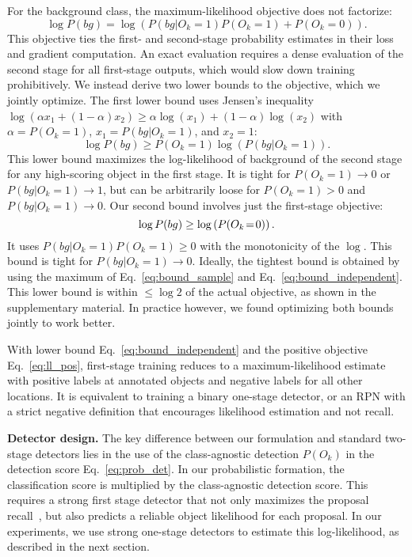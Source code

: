 \documentclass{article}
\renewcommand{\paragraph}[1]{\noindent\textbf{#1}}
\newcommand{\shortrefeq}[1]{Eq.~\eqref{eq:#1}}
\newcommand{\lbleq}[1]{\label{eq:#1}}
\begin{document}
For the background class, the maximum-likelihood objective does not factorize:
\begin{equation*}
  \log P(bg) = \log \left(P(bg|O_k\!=\!1) P(O_k\!=\!1) + P(O_k\!=\!0)\right).
\end{equation*}
This objective ties the first- and second-stage probability estimates in their loss and gradient computation.
An exact evaluation requires a dense evaluation of the second stage for all first-stage outputs, which would slow down training prohibitively.
We instead derive two lower bounds to the objective, which we jointly optimize.
The first lower bound uses Jensen's inequality $\log\left(\alpha x_1+(1-\alpha)x_2\right)\ge \alpha \log(x_{1})+(1-\alpha)\log(x_{2})$ with $\alpha = P(O_k=1)$, $x_1 = P(bg|O_k\!=\!1)$, and $x_2=1$:
\begin{equation}
  \log P(bg) \ge P(O_k\!=\!1) \log \left(P(bg|O_k\!=\!1)\right) \lbleq{bound_sample}.
\end{equation}
This lower bound maximizes the log-likelihood of background of the second stage for any high-scoring object in the first stage.
It is tight for $P(O_k=1)\to0$ or $P(bg|O_k\!=\!1)\to 1$, but can be arbitrarily loose for $P(O_k=1)>0$ and $P(bg|O_k\!=\!1) \to 0$.
Our second bound involves just the first-stage objective:
\begin{equation}
  \log P(bg) \ge \log \left(P(O_k\!=\!0)\right) \lbleq{bound_independent}.\\
\end{equation}
It uses $P(bg|O_k\!=\!1) P(O_k\!=\!1) \ge 0$ with the monotonicity of the $\log$.
This bound is tight for $P(bg|O_k\!=\!1) \to 0$.
Ideally, the tightest bound is obtained by using the maximum of \shortrefeq{bound_sample} and \shortrefeq{bound_independent}.
This lower bound is within $\le \log 2$ of the actual objective, as shown in the supplementary material.
In practice however, we found optimizing both bounds jointly to work better.

With lower bound \shortrefeq{bound_independent} and the positive objective \shortrefeq{ll_pos}, first-stage training reduces to a maximum-likelihood estimate with positive labels at annotated objects and negative labels for all other locations.
It is equivalent to training a binary one-stage detector, or an RPN with a strict negative definition that encourages likelihood estimation and not recall.

\paragraph{Detector design.}
The key difference between our formulation and standard two-stage detectors lies in the use of the class-agnostic detection $P(O_k)$ in the detection score \shortrefeq{prob_det}.
In our probabilistic formation, the classification score is multiplied by the class-agnostic detection score.
This requires a strong first stage detector that not only maximizes the proposal recall~\cite{ren2015faster,uijlings2013selective}, but also predicts a reliable object likelihood for each proposal.
In our experiments, we use strong one-stage detectors to estimate this log-likelihood, as described in the next section.
\end{document}
